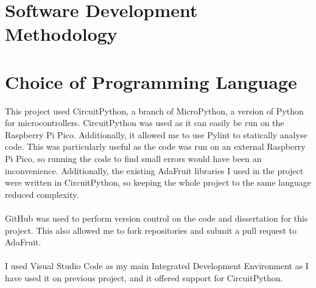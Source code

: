 \documentclass[12pt,a4paper]{report}
\begin{document}
\section{Software Development Methodology}
% 

\section{Choice of Programming Language}  
This project used CircuitPython, a branch of MicroPython, a version of Python for microcontrollers. CircuitPython was used as it can easily be run on the Raspberry Pi Pico. Additionally, it allowed me to use Pylint to statically analyse code. This was particularly useful as the code was run on an external Raspberry Pi Pico, so running the code to find small errors would have been an inconvenience. Additionally, the existing AdaFruit libraries I used in the project were written in CircuitPython, so keeping the whole project to the same language reduced complexity. \\ \\
GitHub was used to perform version control on the code and dissertation for this project. This also allowed me to fork repositories and submit a pull request to AdaFruit. \\ \\ 
I used Visual Studio Code as my main Integrated Development Environment as I have used it on previous project, and it offered support for CircuitPython.
\end{document}
